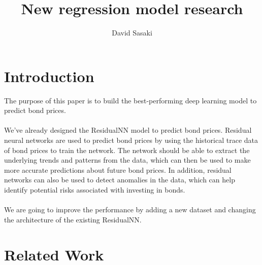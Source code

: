 \documentclass{article}
\title{New regression model research}
\author{David Sasaki}
\begin{document}
\maketitle

\section{Introduction}

The purpose of this paper is to build the best-performing deep learning model to predict bond prices.\\
\\
We've already designed the ResidualNN model to predict bond prices. Residual neural networks are used to predict bond prices by using the historical trace data of bond prices to train the network. The network should be able to extract the underlying trends and patterns from the data, which can then be used to make more accurate predictions about future bond prices. In addition, residual networks can also be used to detect anomalies in the data, which can help identify potential risks associated with investing in bonds.\\
\\
We are going to improve the performance by adding a new dataset and changing the architecture of the existing ResidualNN.

\section{Related Work}
\end{document}
